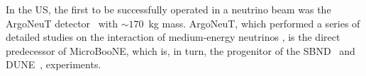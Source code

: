 In the US, the first \lartpc to be successfully operated in a neutrino beam was the ArgoNeuT detector~\cite{Anderson:2012-argoneut} with $\sim170$~kg mass.   ArgoNeuT, which performed a series of detailed studies on the interaction of medium-energy neutrinos \cite{Acciarri:2013-argoneut-recomb,Anderson:2012-argoneut-CCincl,Acciarri:2014-argoneut-CCxsec,Acciarri:2014eit}, is the direct predecessor of MicroBooNE, which is, in turn, the progenitor of the SBND~\cite{Antonello:2015lea} and DUNE~\cite{Acciarri:2015uup}, experiments.








